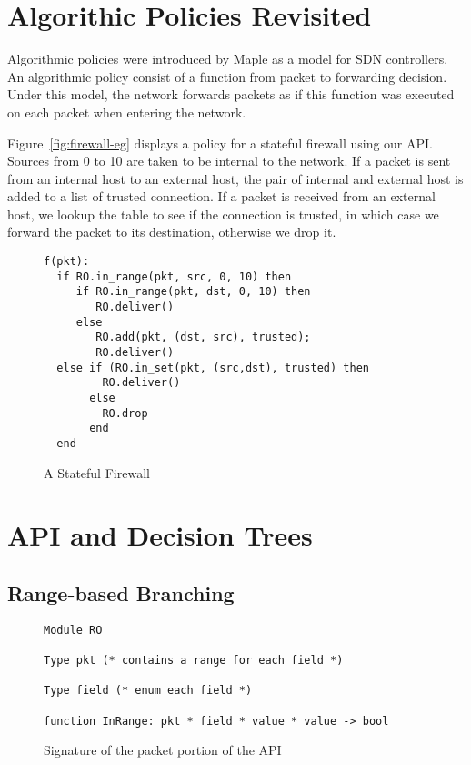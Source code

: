 \documentclass[12pt]{article}
\begin{document}
\section*{Algorithic Policies Revisited}
Algorithmic policies were introduced by Maple as a model for SDN controllers. An algorithmic policy consist of a function from packet to forwarding decision. Under this model, the network forwards packets as if this function was executed on each packet when entering the network. 

Figure~\ref{fig:firewall-eg} displays a policy for a stateful firewall using our API. Sources from 0 to 10 are taken to be internal to the network. If a packet is sent from an internal host to an external host, the pair of internal and external host is added to a list of trusted connection. If a packet is received from an external host, we lookup the table to see if the connection is trusted, in which case we forward the packet to its destination, otherwise we drop it.


\begin{figure}
\begin{lstlisting}
f(pkt):
  if RO.in_range(pkt, src, 0, 10) then
     if RO.in_range(pkt, dst, 0, 10) then
        RO.deliver()
     else 
        RO.add(pkt, (dst, src), trusted);
        RO.deliver()
  else if (RO.in_set(pkt, (src,dst), trusted) then
         RO.deliver()
       else
         RO.drop
       end
  end                
  \end{lstlisting}
\label{fig:firewallcode}
\caption{A Stateful Firewall}
\end{figure}




\section*{API and Decision Trees}
   \subsection*{Range-based Branching}

   \begin{figure}
\begin{lstlisting}
Module RO

Type pkt (* contains a range for each field *)

Type field (* enum each field *)

function InRange: pkt * field * value * value -> bool

\end{lstlisting}

\caption{Signature of the packet portion of the API}
\end{figure}
\end{document}
